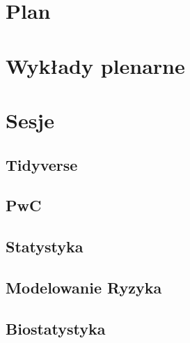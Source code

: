 \documentclass[11pt,twoside,b5paper]{book}
\begin{document}
\chapter{Plan}

\chapter{Wykłady plenarne}{}

\newpage

\newpage

\newpage

\newpage

\newpage

\newpage

\newpage

\newpage

\newpage


\chapter{Sesje}{\LARGE}
\section{Tidyverse}{}






\section{PwC}


\section{Statystyka}






\section{Modelowanie Ryzyka}


\section{Biostatystyka}





\end{document}
